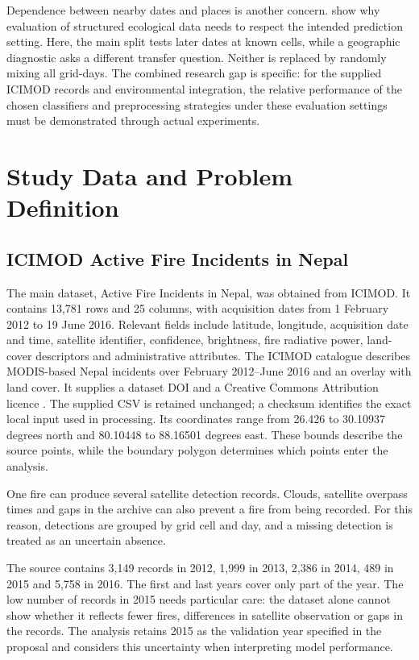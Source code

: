 \documentclass[conference,a4paper]{IEEEtran}
\begin{document}
Dependence between nearby dates and places is another concern. \citet{roberts} show why evaluation of structured ecological data needs to respect the intended prediction setting. Here, the main split tests later dates at known cells, while a geographic diagnostic asks a different transfer question. Neither is replaced by randomly mixing all grid-days. The combined research gap is specific: for the supplied ICIMOD records and environmental integration, the relative performance of the chosen classifiers and preprocessing strategies under these evaluation settings must be demonstrated through actual experiments.
\section{Study Data and Problem Definition}
\subsection{ICIMOD Active Fire Incidents in Nepal}
The main dataset, Active Fire Incidents in Nepal, was obtained from ICIMOD. It contains 13,781 rows and 25 columns, with acquisition dates from 1 February 2012 to 19 June 2016. Relevant fields include latitude, longitude, acquisition date and time, satellite identifier, confidence, brightness, fire radiative power, land-cover descriptors and administrative attributes. The ICIMOD catalogue describes MODIS-based Nepal incidents over February 2012--June 2016 and an overlay with land cover. It supplies a dataset DOI and a Creative Commons Attribution licence \citep{icimodfire}. The supplied CSV is retained unchanged; a checksum identifies the exact local input used in processing. Its coordinates range from 26.426 to 30.10937 degrees north and 80.10448 to 88.16501 degrees east. These bounds describe the source points, while the boundary polygon determines which points enter the analysis.

One fire can produce several satellite detection records. Clouds, satellite overpass times and gaps in the archive can also prevent a fire from being recorded. For this reason, detections are grouped by grid cell and day, and a missing detection is treated as an uncertain absence.

The source contains 3,149 records in 2012, 1,999 in 2013, 2,386 in 2014, 489 in 2015 and 5,758 in 2016. The first and last years cover only part of the year. The low number of records in 2015 needs particular care: the dataset alone cannot show whether it reflects fewer fires, differences in satellite observation or gaps in the records. The analysis retains 2015 as the validation year specified in the proposal and considers this uncertainty when interpreting model performance.
\end{document}
